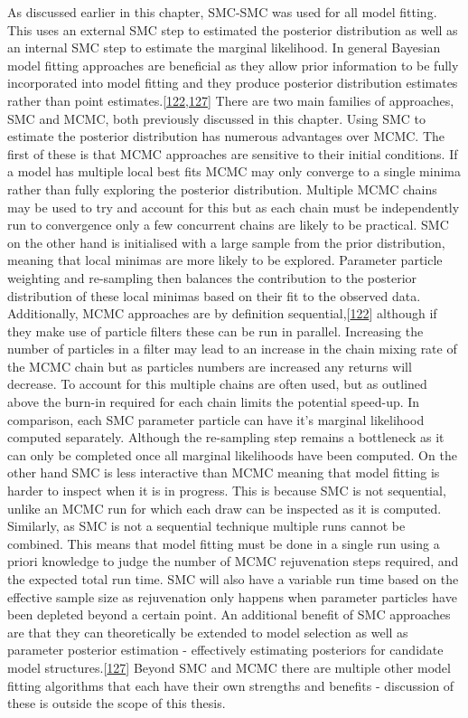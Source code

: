 \documentclass[11pt,twoside]{bristolthesis}
\begin{document}
  As discussed earlier in this chapter, SMC-SMC was used for all model fitting. This uses an external SMC step to estimated the posterior distribution as well as an internal SMC step to estimate the marginal likelihood. In general Bayesian model fitting approaches are beneficial as they allow prior information to be fully incorporated into model fitting and they produce posterior distribution estimates rather than point estimates.{[}\protect\hyperlink{ref-Murray2015}{122},\protect\hyperlink{ref-Toni2009}{127}{]} There are two main families of approaches, SMC and MCMC, both previously discussed in this chapter. Using SMC to estimate the posterior distribution has numerous advantages over MCMC. The first of these is that MCMC approaches are sensitive to their initial conditions. If a model has multiple local best fits MCMC may only converge to a single minima rather than fully exploring the posterior distribution. Multiple MCMC chains may be used to try and account for this but as each chain must be independently run to convergence only a few concurrent chains are likely to be practical. SMC on the other hand is initialised with a large sample from the prior distribution, meaning that local minimas are more likely to be explored. Parameter particle weighting and re-sampling then balances the contribution to the posterior distribution of these local minimas based on their fit to the observed data. Additionally, MCMC approaches are by definition sequential,{[}\protect\hyperlink{ref-Murray2015}{122}{]} although if they make use of particle filters these can be run in parallel. Increasing the number of particles in a filter may lead to an increase in the chain mixing rate of the MCMC chain but as particles numbers are increased any returns will decrease. To account for this multiple chains are often used, but as outlined above the burn-in required for each chain limits the potential speed-up. In comparison, each SMC parameter particle can have it's marginal likelihood computed separately. Although the re-sampling step remains a bottleneck as it can only be completed once all marginal likelihoods have been computed. On the other hand SMC is less interactive than MCMC meaning that model fitting is harder to inspect when it is in progress. This is because SMC is not sequential, unlike an MCMC run for which each draw can be inspected as it is computed. Similarly, as SMC is not a sequential technique multiple runs cannot be combined. This means that model fitting must be done in a single run using a priori knowledge to judge the number of MCMC rejuvenation steps required, and the expected total run time. SMC will also have a variable run time based on the effective sample size as rejuvenation only happens when parameter particles have been depleted beyond a certain point. An additional benefit of SMC approaches are that they can theoretically be extended to model selection as well as parameter posterior estimation - effectively estimating posteriors for candidate model structures.{[}\protect\hyperlink{ref-Toni2009}{127}{]} Beyond SMC and MCMC there are multiple other model fitting algorithms that each have their own strengths and benefits - discussion of these is outside the scope of this thesis.
  
\end{document}
